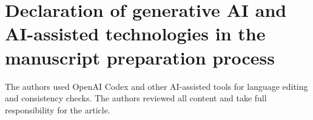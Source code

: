 \documentclass[preprint,12pt]{elsarticle}
\begin{document}
\section*{Declaration of generative AI and AI-assisted technologies in the manuscript preparation process}
The authors used OpenAI Codex and other AI-assisted tools for language editing and consistency checks. The authors reviewed all content and take full responsibility for the article.



\end{document}
